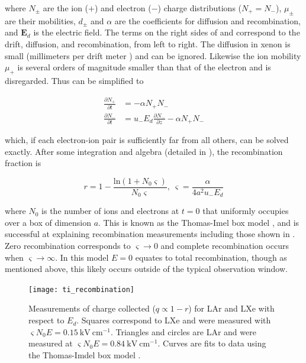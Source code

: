 \noindent where $N_{\pm}$ are the ion ($+$) and electron ($-$) charge distributions ($N_+ = N_-$), $\mu_{\pm}$ are their mobilities,
$d_{\pm}$ and $\alpha$
are the coefficients for diffusion and recombination, and $\mathbf{E}_d$ is the electric field.  The terms on the right sides of
 and  correspond to the drift, diffusion, and recombination, from left to right.  The
diffusion in xenon is small (millimeters per drift meter ) and can be ignored.  Likewise the ion mobility $\mu_{+}$
is several orders of magnitude smaller than that
of the electron and is disregarded.  Thus  can be simplified to

\begin{subequations}
\begin{align}
\frac{\partial N_{+}}{\partial t} &= - \alpha N_{+} N_{-}
\label{eq:diff_simple_plus} \\
\frac{\partial N_{-}}{\partial t} &= u_{-} E_d \frac{\partial N_{-}}{\partial z} - \alpha N_{+} N_{-}
\label{eq:diff_simple_minus}
\end{align}
\end{subequations}

\noindent which, if each electron-ion pair is sufficiently far from all others, can be solved exactly.  After some integration and algebra
(detailed in ), the recombination fraction is

\begin{equation}
r = 1 - \frac{\mathrm{ln} (1 + N_0 \varsigma)}{N_0 \varsigma},\ \varsigma = \frac{\alpha}{4 a^{2} u_{-} E_d}
\label{eq:ti_recomb}
\end{equation}

\noindent where $N_0$ is the number of ions and electrons at $t = 0$ that uniformly occupies over a box of dimension $a$.  This is known
as the Thomas-Imel box model ,
and is successful at explaining recombination measurements including those shown in .  Zero recombination
corresponds to
$\varsigma \rightarrow 0$ and complete recombination occurs when $\varsigma \rightarrow \infty$.  In this model $E = 0$ equates to total
recombination, though as mentioned above, this likely occurs outside of the typical observation window.

\begin{figure}
\texttt{[image: ti\_recombination]}
\caption[Measurements of charge collected ($q \propto 1 - r$) for LAr and LXe with respect to $E_d$.]{Measurements of charge collected
($q \propto 1 - r$) for LAr and LXe with respect to $E_d$.  Squares correspond to LXe and were
measured with $\varsigma N_0 E = 0.15\ \mathrm{kV\ cm^{-1}}$.  Triangles and circles are LAr and were measured at
$\varsigma N_0 E = 0.84\ \mathrm{kV\ cm^{-1}}$.  Curves are fits to data using the Thomas-Imdel box model .}
\label{fig:ti_recomb}
\end{figure}

